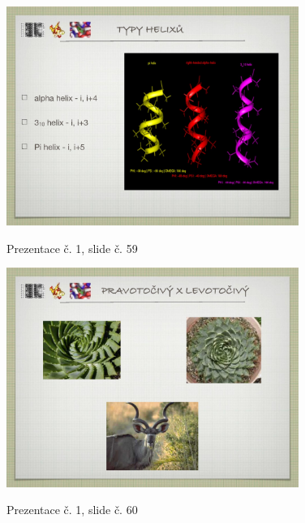 \documentclass[DIV=8]{scrreprt}
\begin{document}
\begin{figure}
    \caption{Prezentace č. 1, slide č. 59}
    \includegraphics[width=0.85\textwidth]{slides-1/slide-59.jpg}
    \centering
    \label{slides-1-slide-59}
\end{figure}
\begin{figure}
    \caption{Prezentace č. 1, slide č. 60}
    \includegraphics[width=0.85\textwidth]{slides-1/slide-60.jpg}
    \centering
    \label{slides-1-slide-60}
\end{figure}
\end{document}
